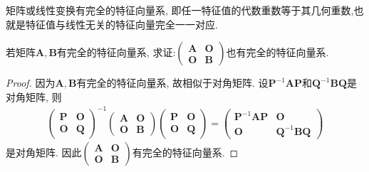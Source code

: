 \documentclass[../../main.tex]{subfiles}%
\begin{document}
矩阵或线性变换有完全的特征向量系, 即任一特征值的代数重数等于其几何重数,也就是特征值与线性无关的特征向量完全一一对应.

\begin{proposition}\label{example-6.38}
若矩阵\(\boldsymbol{A},\boldsymbol{B}\)有完全的特征向量系, 求证:\(\begin{pmatrix}
\boldsymbol{A}&\boldsymbol{O}\\
\boldsymbol{O}&\boldsymbol{B}
\end{pmatrix}\)也有完全的特征向量系.
\end{proposition}
\begin{proof}
因为\(\boldsymbol{A},\boldsymbol{B}\)有完全的特征向量系, 故相似于对角矩阵. 设\(\boldsymbol{P}^{-1}\boldsymbol{AP}\)和\(\boldsymbol{Q}^{-1}\boldsymbol{BQ}\)是对角矩阵, 则
\begin{align*}
\begin{pmatrix}
\boldsymbol{P}&\boldsymbol{O}\\
\boldsymbol{O}&\boldsymbol{Q}
\end{pmatrix}^{-1}
\begin{pmatrix}
\boldsymbol{A}&\boldsymbol{O}\\
\boldsymbol{O}&\boldsymbol{B}
\end{pmatrix}
\begin{pmatrix}
\boldsymbol{P}&\boldsymbol{O}\\
\boldsymbol{O}&\boldsymbol{Q}
\end{pmatrix}
=
\begin{pmatrix}
\boldsymbol{P}^{-1}\boldsymbol{AP}&\boldsymbol{O}\\
\boldsymbol{O}&\boldsymbol{Q}^{-1}\boldsymbol{BQ}
\end{pmatrix}
\end{align*}
是对角矩阵. 因此\(\begin{pmatrix}
\boldsymbol{A}&\boldsymbol{O}\\
\boldsymbol{O}&\boldsymbol{B}
\end{pmatrix}\)有完全的特征向量系. 
\end{proof}
\end{document}

